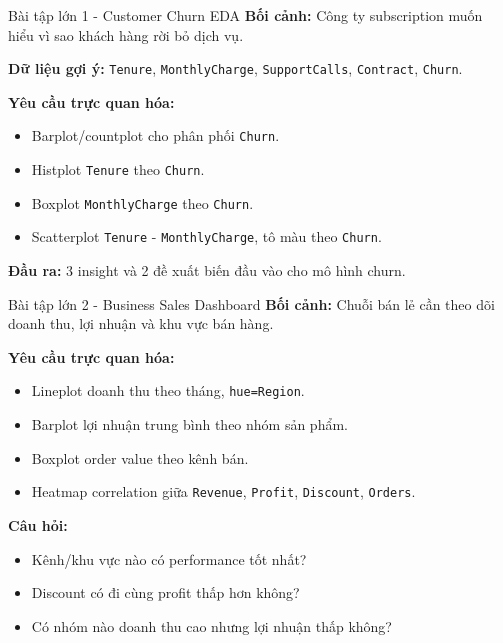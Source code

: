 \documentclass[aspectratio=169,11pt]{beamer}
\begin{document}
\begin{frame}{Bài tập lớn 1 - Customer Churn EDA}
\textbf{Bối cảnh:} Công ty subscription muốn hiểu vì sao khách hàng rời bỏ dịch vụ.

\vspace{0.2cm}
\textbf{Dữ liệu gợi ý:} \texttt{Tenure}, \texttt{MonthlyCharge}, \texttt{SupportCalls}, \texttt{Contract}, \texttt{Churn}.

\vspace{0.2cm}
\textbf{Yêu cầu trực quan hóa:}
\begin{itemize}
    \item Barplot/countplot cho phân phối \texttt{Churn}.
    \item Histplot \texttt{Tenure} theo \texttt{Churn}.
    \item Boxplot \texttt{MonthlyCharge} theo \texttt{Churn}.
    \item Scatterplot \texttt{Tenure} - \texttt{MonthlyCharge}, tô màu theo \texttt{Churn}.
\end{itemize}

\textbf{Đầu ra:} 3 insight và 2 đề xuất biến đầu vào cho mô hình churn.
\end{frame}

\begin{frame}{Bài tập lớn 2 - Business Sales Dashboard}
\textbf{Bối cảnh:} Chuỗi bán lẻ cần theo dõi doanh thu, lợi nhuận và khu vực bán hàng.

\vspace{0.2cm}
\textbf{Yêu cầu trực quan hóa:}
\begin{itemize}
    \item Lineplot doanh thu theo tháng, \texttt{hue=Region}.
    \item Barplot lợi nhuận trung bình theo nhóm sản phẩm.
    \item Boxplot order value theo kênh bán.
    \item Heatmap correlation giữa \texttt{Revenue}, \texttt{Profit}, \texttt{Discount}, \texttt{Orders}.
\end{itemize}

\textbf{Câu hỏi:}
\begin{itemize}
    \item Kênh/khu vực nào có performance tốt nhất?
    \item Discount có đi cùng profit thấp hơn không?
    \item Có nhóm nào doanh thu cao nhưng lợi nhuận thấp không?
\end{itemize}
\end{frame}
\end{document}
